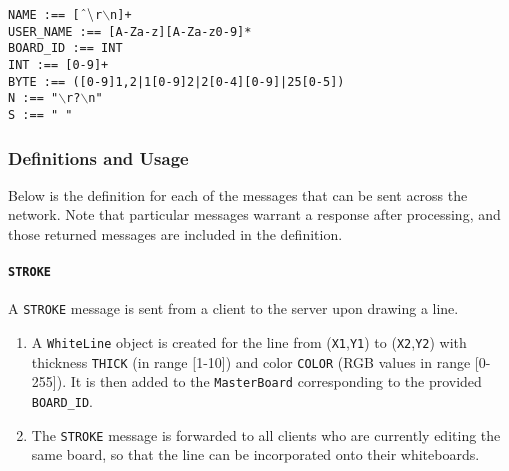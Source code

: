\texttt{NAME :== [$\char`\^ \backslash$r$\backslash$n]+}\\
\texttt{USER\_NAME :== [A-Za-z][A-Za-z0-9]*}\\
\texttt{BOARD\_ID :== INT}\\

\texttt{INT :== [0-9]+}\\
\texttt{BYTE :== ([0-9]{1,2}|1[0-9]{2}|2[0-4][0-9]|25[0-5])}\\ %
\texttt{N :== "$\backslash$r?$\backslash$n"}\\
\texttt{S :== " "}\\

\setlength{\parindent}{15pt} %

\subsubsection{Definitions and Usage}
Below is the definition for each of the messages that can be sent across the network. Note that particular messages warrant a response after processing, and those returned messages are included in the definition.

\paragraph{\texttt{STROKE}} A \texttt{STROKE} message is sent from a client to the server upon drawing a line.
\begin{enumerate}
\item A \texttt{WhiteLine} object is created for the line from (\texttt{X1},\texttt{Y1}) to (\texttt{X2},\texttt{Y2}) with thickness \texttt{THICK} (in range [1-10]) and color \texttt{COLOR} (RGB values in range [0-255]). It is then added to the \texttt{MasterBoard} corresponding to the provided \texttt{BOARD\_ID}.
\item The \texttt{STROKE} message is forwarded to all clients who are currently editing the same board, so that the line can be incorporated onto their whiteboards.
\end{enumerate}

